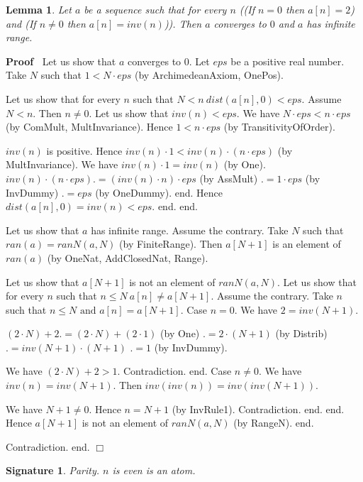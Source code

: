 \documentclass{article}
\newenvironment{forthel}{\begin{leftbar}}{\end{leftbar}}
\newenvironment{proof}{\noindent\textbf{Proof\ }}{\hspace*{\fill}$\Box$\medskip}
\newtheorem{lemma}{Lemma}
\newtheorem{signature}{Signature}
\begin{document}
\begin{forthel}
	\begin{lemma} Let $a$ be a sequence such that for every $n$
	((If $n = 0$ then $a[n] = 2$) and (If $n \neq 0$ then $a[n] = inv(n)$)).
	Then $a$ converges to $0$ and $a$ has infinite range.
	\end{lemma}
	\begin{proof} Let us show that $a$ converges to $0$.
	Let $eps$ be a positive real number. 
	Take $N$ such that $1 < N \cdot eps$ (by ArchimedeanAxiom, OnePos).
	
	Let us show that for every $n$ such that $N < n \ dist(a[n],0) < eps$.
	Assume $N < n$. Then $n \neq 0$.
	Let us show that $inv(n) < eps$.
	We have $N \cdot eps < n \cdot eps$ (by ComMult, MultInvariance).
	Hence $1 < n \cdot eps$ (by TransitivityOfOrder).
	
	$inv(n)$ is positive.
	Hence $inv(n) \cdot 1 < inv(n) \cdot (n \cdot eps)$ (by MultInvariance).
	We have $inv(n) \cdot 1 = inv(n)$ (by One).
	$inv(n) \cdot (n \cdot eps) .= (inv(n) \cdot n) \cdot eps$ (by AssMult)
	$.= 1 \cdot eps$ (by InvDummy)
	$.= eps$ (by OneDummy).
	end.
	Hence $dist(a[n],0) = inv(n) < eps$.
	end.
	end.
	
	Let us show that $a$ has infinite range.
	Assume the contrary.
	Take $N$ such that $ran(a) = ranN(a,N)$ (by FiniteRange).
	Then $a[N + 1]$ is an element of $ran(a)$ (by OneNat, AddClosedNat, Range).
	
	Let us show that $a[N + 1]$ is not an element of $ranN(a,N)$.
	Let us show that for every $n$ such that $n \leq N \ a[n] \neq a[N + 1]$.
	Assume the contrary.
	Take $n$ such that $n \leq N \text{ and } a[n] = a[N + 1]$.
	Case $n = 0$.
	We have $2 = inv(N + 1)$.
	
	$(2 \cdot N) + 2 .= (2 \cdot N) + (2 \cdot 1)$ (by One)
	$.= 2 \cdot (N + 1)$ (by Distrib)
	$.= inv(N + 1) \cdot (N + 1)$
	$.= 1$ (by InvDummy).
	
	We have $(2 \cdot N) + 2 > 1$.
	Contradiction.
	end.
	Case $n \neq 0$.
	We have $inv(n) = inv(N + 1)$.
	Then $inv(inv(n)) = inv(inv(N + 1))$.
	
	We have $N + 1 \neq 0$.
	Hence $n = N + 1$ (by InvRule1).
	Contradiction.
	end.
	end.
	Hence $a[N + 1]$ is not an element of $ranN(a,N)$ (by RangeN).
	end.
	
	Contradiction.
	end.
	\end{proof}
	
	\begin{signature} Parity.
	$n$ is even is an atom.
	\end{signature}
	

\end{forthel}
\end{document}
